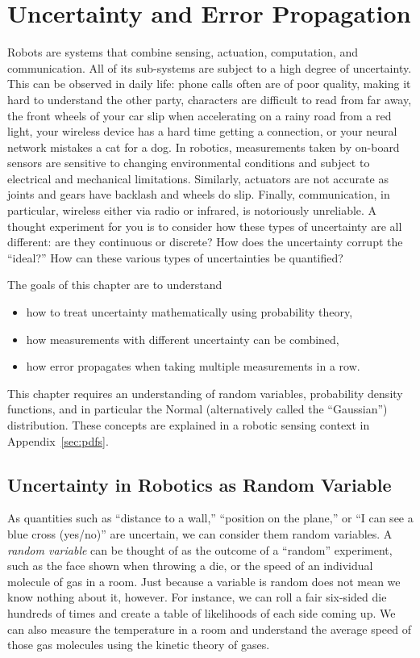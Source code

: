 \chapter{Uncertainty and Error Propagation}\label{chap:uncertainty}
Robots are systems that combine sensing, actuation, computation, and communication. All of its sub-systems are subject to a high degree
of uncertainty. This can be observed in daily life: phone calls often are of poor quality, making it hard to understand the other party,
characters are difficult to read from far away,  the front wheels of your car slip when accelerating on a rainy road from a red light,
your wireless device has a hard time getting a connection, or your neural network mistakes a cat for a dog. In robotics, measurements
taken by on-board sensors are sensitive to changing environmental conditions and subject to electrical and mechanical limitations.
Similarly, actuators are not accurate as joints and gears have backlash and wheels do slip. Finally, communication, in particular,
wireless either via radio or infrared, is notoriously unreliable. A thought experiment for you is to consider how these types of
uncertainty are all different: are they continuous or discrete? How does the uncertainty corrupt the ``ideal?'' How can these various
types of uncertainties be quantified?

The goals of this chapter are to understand
\begin{itemize}
\item how to treat uncertainty mathematically using probability theory,
\item how measurements with different uncertainty can be combined,
\item how error propagates when taking multiple measurements in a row.
\end{itemize}

This chapter requires an understanding of random variables, probability density functions, and in particular the Normal
(alternatively called the ``Gaussian'') distribution. These concepts are explained in a robotic sensing context in Appendix~\ref{sec:pdfs}.

\section{Uncertainty in Robotics as Random Variable}
As quantities such as ``distance to a wall,'' ``position on the plane,'' or ``I can see a blue cross (yes/no)'' are uncertain, we can
consider them random variables. A \emph{random variable} can be thought of as the outcome of a ``random''
experiment, such as the face shown when throwing a die, or the speed of an individual molecule of gas in a room. Just because a
variable is random does not mean we know nothing about it, however. For instance, we can roll a fair six-sided die hundreds of times
and create a table of likelihoods of each side coming up. We can also measure the temperature in a room and understand the
average speed of those gas molecules using the kinetic theory of gases.

